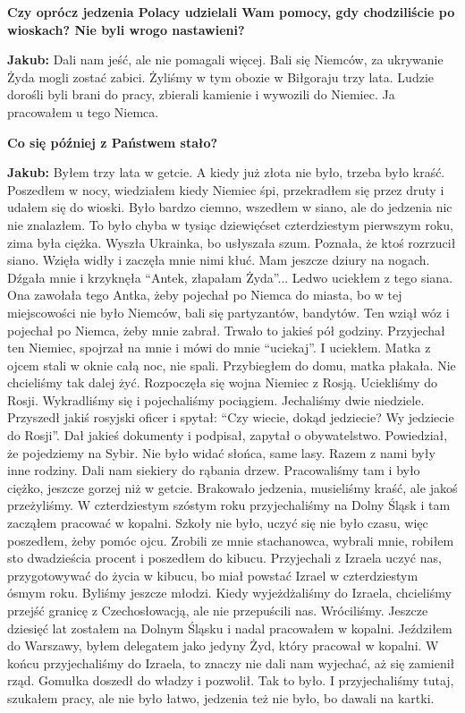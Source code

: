 \begin{otherlanguage}{polish}
\textbf{Czy oprócz jedzenia Polacy udzielali Wam pomocy, gdy chodziliście po wioskach? Nie byli wrogo nastawieni?} 

\textbf{Jakub:} Dali nam jeść, ale nie pomagali więcej. Bali się Niemców, za ukrywanie Żyda mogli zostać zabici. Żyliśmy w tym obozie w Biłgoraju trzy lata. Ludzie dorośli byli brani do pracy, zbierali kamienie i wywozili do Niemiec. Ja pracowałem u tego Niemca.

\textbf{Co się później z Państwem stało?} 

\textbf{Jakub:} Byłem trzy lata w getcie. A kiedy już złota nie było, trzeba było kraść. Poszedłem w nocy, wiedziałem kiedy Niemiec śpi, przekradłem się przez druty i udałem się do wioski. Było bardzo ciemno, wszedłem w siano, ale do jedzenia nic nie znalazłem. To było chyba w tysiąc dziewięćset czterdziestym pierwszym roku, zima była ciężka. Wyszła Ukrainka, bo usłyszała szum. Poznała, że ktoś rozrzucił siano. Wzięła widły i zaczęła mnie nimi kłuć. Mam jeszcze dziury na nogach. Dźgała mnie i krzyknęła "`Antek, złapałam Żyda"'... Ledwo uciekłem z tego siana. Ona zawołała tego Antka, żeby pojechał po Niemca do miasta, bo w tej miejscowości nie było Niemców, bali się partyzantów, bandytów. Ten wziął wóz i pojechał po Niemca, żeby mnie zabrał. Trwało to jakieś pół godziny. Przyjechał ten Niemiec, spojrzał na mnie i mówi do mnie "`uciekaj"'. I uciekłem. Matka z ojcem stali w oknie całą noc, nie spali. Przybiegłem do domu, matka płakała. Nie chcieliśmy tak dalej żyć. Rozpoczęła się wojna Niemiec z Rosją. Uciekliśmy do Rosji. Wykradliśmy się i pojechaliśmy pociągiem. Jechaliśmy dwie niedziele. Przyszedł jakiś rosyjski oficer i spytał: "`Czy wiecie, dokąd jedziecie? Wy jedziecie do Rosji"'. Dał jakieś dokumenty i podpisał, zapytał o obywatelstwo. Powiedział, że pojedziemy na Sybir. Nie było widać słońca, same lasy. Razem z nami były inne rodziny. Dali nam siekiery do rąbania drzew. Pracowaliśmy tam i było ciężko, jeszcze gorzej niż w getcie. Brakowało jedzenia, musieliśmy kraść, ale jakoś przeżyliśmy. W czterdziestym szóstym roku przyjechaliśmy na Dolny Śląsk i tam zacząłem pracować w kopalni. Szkoły nie było, uczyć się nie było czasu, więc poszedłem, żeby pomóc ojcu. Zrobili ze mnie stachanowca, wybrali mnie, robiłem sto dwadzieścia procent i poszedłem do kibucu. Przyjechali z Izraela uczyć nas, przygotowywać do życia w kibucu, bo miał powstać Izrael w czterdziestym ósmym roku. Byliśmy jeszcze młodzi. Kiedy wyjeżdżaliśmy do Izraela, chcieliśmy przejść granicę z Czechosłowacją, ale nie przepuścili nas. Wróciliśmy. Jeszcze dziesięć lat zostałem na Dolnym Śląsku i nadal pracowałem w kopalni. Jeździłem do Warszawy, byłem delegatem jako jedyny Żyd, który pracował w kopalni. W końcu przyjechaliśmy do Izraela, to znaczy nie dali nam wyjechać, aż się zamienił rząd. Gomułka doszedł do władzy i pozwolił. Tak to było. I przyjechaliśmy tutaj, szukałem pracy, ale nie było łatwo, jedzenia też nie było, bo dawali na kartki.


\end{otherlanguage}
